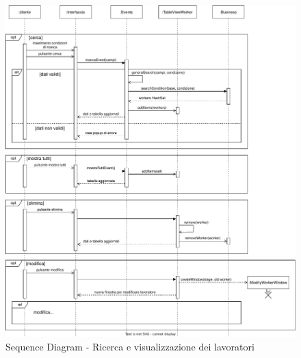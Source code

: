 \documentclass[a4paper,11pt]{article}
\begin{document}
\begin{figure}[htpb]
	\centering
	\hspace*{-2cm}
	\includegraphics[width=1.3\textwidth]{diagrams/Sequence_Diagram_-_Ricerca.pdf}
	\caption{Sequence Diagram - Ricerca e visualizzazione dei lavoratori}
	\label{fig:sqc_dia_src}
\end{figure}
\end{document}
